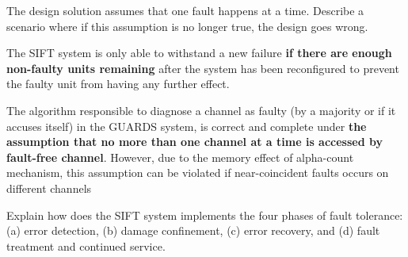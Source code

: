 \documentclass[12pt]{exam}
\begin{document}
\begin{questions}
    \question The design solution assumes that one fault happens at a time. Describe a scenario where if this assumption is no longer true, the design goes wrong.
    
    \begin{solution}
        
        The SIFT system is only able to withstand a new failure \textbf{if there are enough non-faulty units remaining }after the system has been reconfigured
	to prevent the faulty unit from having any further effect.
        
        The algorithm responsible to diagnose a channel as faulty (by a majority or if it accuses itself) in the GUARDS system, is correct and 
        complete under \textbf{the assumption that no more than one channel at a time is accessed by fault-free channel}. However, due to the 
        memory effect of alpha-count mechanism, this assumption can be violated if near-coincident faults occurs on different channels
    \end{solution}

    
    
    \question Explain how does the SIFT system implements the four phases of fault tolerance: (a) error detection, (b) damage confinement, (c) error recovery, and (d) fault treatment and continued service.
    

\end{questions}
\end{document}
